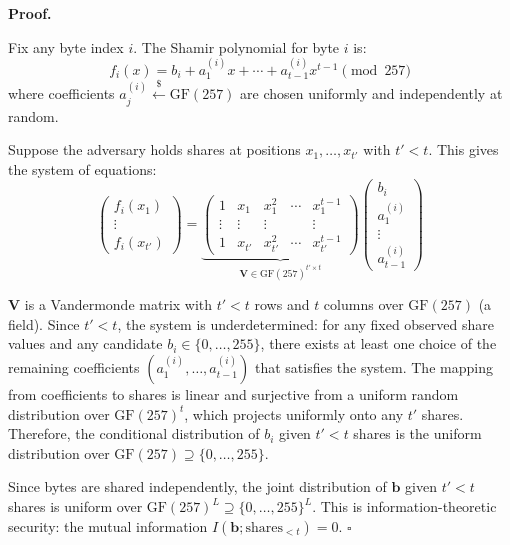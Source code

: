 \noindent\textbf{Proof.}

Fix any byte index $i$. The Shamir polynomial for byte $i$ is:
\begin{equation}
  f_i(x) = b_i + a_1^{(i)} x + \cdots + a_{t-1}^{(i)} x^{t-1} \pmod{257}
\end{equation}
where coefficients $a_j^{(i)} \stackrel{\$}{\leftarrow} \mathrm{GF}(257)$
are chosen uniformly and independently at random.

Suppose the adversary holds shares at positions $x_1, \ldots, x_{t'}$ with
$t' < t$. This gives the system of equations:
\begin{equation}
  \begin{pmatrix} f_i(x_1) \\ \vdots \\ f_i(x_{t'}) \end{pmatrix}
  = \underbrace{\begin{pmatrix} 1 & x_1 & x_1^2 & \cdots & x_1^{t-1} \\
  \vdots & \vdots & \vdots & & \vdots \\
  1 & x_{t'} & x_{t'}^2 & \cdots & x_{t'}^{t-1}
  \end{pmatrix}}_{\mathbf{V} \in \mathrm{GF}(257)^{t' \times t}}
  \begin{pmatrix} b_i \\ a_1^{(i)} \\ \vdots \\ a_{t-1}^{(i)} \end{pmatrix}
\end{equation}

$\mathbf{V}$ is a Vandermonde matrix with $t' < t$ rows and $t$ columns over
$\mathrm{GF}(257)$ (a field). Since $t' < t$, the system is underdetermined:
for any fixed observed share values and any candidate $b_i \in \{0, \ldots, 255\}$,
there exists at least one choice of the remaining coefficients
$(a_1^{(i)}, \ldots, a_{t-1}^{(i)})$ that satisfies the system. The mapping
from coefficients to shares is linear and surjective from a uniform random
distribution over $\mathrm{GF}(257)^t$, which projects uniformly onto any $t'$
shares. Therefore, the conditional distribution of $b_i$ given
$t' < t$ shares is the uniform distribution over $\mathrm{GF}(257) \supseteq
\{0, \ldots, 255\}$.

Since bytes are shared independently, the joint distribution of $\mathbf{b}$
given $t' < t$ shares is uniform over $\mathrm{GF}(257)^L \supseteq
\{0,\ldots,255\}^L$. This is information-theoretic security: the mutual
information $I(\mathbf{b}; \text{shares}_{< t}) = 0$.
\hfill$\square$

